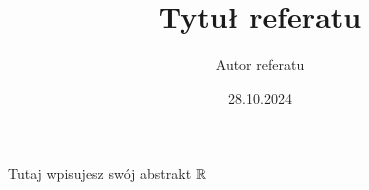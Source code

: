 \documentclass{knmtabstrakt}
\title{Tytuł referatu}
\author{Autor referatu}
\date{28.10.2024}
\begin{document}
\maketitle

Tutaj wpisujesz swój abstrakt $\mathbb{R}$
\end{document}
